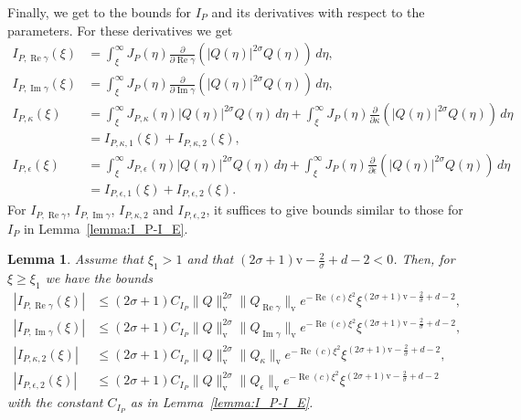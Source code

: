 \documentclass[11pt]{article}
\DeclareMathOperator{\real}{Re}
\DeclareMathOperator{\imag}{Im}
\newcommand{\normv}{\mathrm{v}}
\newtheorem{lemma}[definition]{Lemma}
\begin{document}
Finally, we get to the bounds for \(I_{P}\) and its derivatives with
respect to the parameters. For these derivatives we get
\begin{align*}
  I_{P,\real\gamma}(\xi)
  &= \int_{\xi}^{\infty}J_{P}(\eta)
    \frac{\partial}{\partial \real\gamma}(|Q(\eta)|^{2\sigma}Q(\eta))\,d\eta,\\
  I_{P,\imag\gamma}(\xi)
  &= \int_{\xi}^{\infty}J_{P}(\eta)
    \frac{\partial}{\partial \imag\gamma}(|Q(\eta)|^{2\sigma}Q(\eta))\,d\eta,\\
  I_{P,\kappa}(\xi)
  &= \int_{\xi}^{\infty}J_{P,\kappa}(\eta)|Q(\eta)|^{2\sigma}Q(\eta)\,d\eta
    + \int_{\xi}^{\infty}J_{P}(\eta)
    \frac{\partial}{\partial \kappa}(|Q(\eta)|^{2\sigma}Q(\eta))\,d\eta\\
  &= I_{P,\kappa,1}(\xi) + I_{P,\kappa,2}(\xi),\\
  I_{P,\epsilon}(\xi)
  &= \int_{\xi}^{\infty}J_{P,\epsilon}(\eta)|Q(\eta)|^{2\sigma}Q(\eta)\,d\eta
    + \int_{\xi}^{\infty}J_{P}(\eta)
    \frac{\partial}{\partial \epsilon}(|Q(\eta)|^{2\sigma}Q(\eta))\,d\eta\\
  &= I_{P,\epsilon,1}(\xi) + I_{P,\epsilon,2}(\xi).
\end{align*}
For \(I_{P,\real\gamma}\), \(I_{P,\imag\gamma}\), \(I_{P,\kappa,2}\)
and \(I_{P,\epsilon,2}\), it suffices to give bounds similar to those
for \(I_{P}\) in Lemma~\ref{lemma:I_P-I_E}.

\begin{lemma}\label{lemma:I-P-dgamma-dkappa-depsilon}
  Assume that \(\xi_{1} > 1\) and that
  \((2\sigma + 1)\normv - \frac{2}{\sigma} + d - 2 < 0\). Then, for
  \(\xi \geq \xi_{1}\) we have the bounds
  \begin{align*}
    |I_{P,\real\gamma}(\xi)|
    &\leq (2\sigma + 1)C_{I_{P}}\|Q\|_{\normv}^{2\sigma}\|Q_{\real\gamma}\|_\normv
      e^{-\real(c)\xi^{2}}\xi^{(2\sigma + 1)\normv - \frac{2}{\sigma} + d - 2},\\
    |I_{P,\imag\gamma}(\xi)|
    &\leq (2\sigma + 1)C_{I_{P}}\|Q\|_{\normv}^{2\sigma}\|Q_{\imag\gamma}\|_\normv
      e^{-\real(c)\xi^{2}}\xi^{(2\sigma + 1)\normv - \frac{2}{\sigma} + d - 2},\\
    \left|I_{P,\kappa,2}(\xi)\right|
    &\leq (2\sigma + 1)C_{I_{P}}\|Q\|_{\normv}^{2\sigma}\|Q_{\kappa}\|_{\normv}
      e^{-\real(c)\xi^{2}}\xi^{(2\sigma + 1)\normv - \frac{2}{\sigma} + d - 2},\\
    \left|I_{P,\epsilon,2}(\xi)\right|
    &\leq (2\sigma + 1)C_{I_{P}}\|Q\|_{\normv}^{2\sigma}\|Q_{\epsilon}\|_{\normv}
      e^{-\real(c)\xi^{2}}\xi^{(2\sigma + 1)\normv - \frac{2}{\sigma} + d - 2}
  \end{align*}
  with the constant \(C_{I_{P}}\) as in Lemma~\ref{lemma:I_P-I_E}.
\end{lemma}
\end{document}
